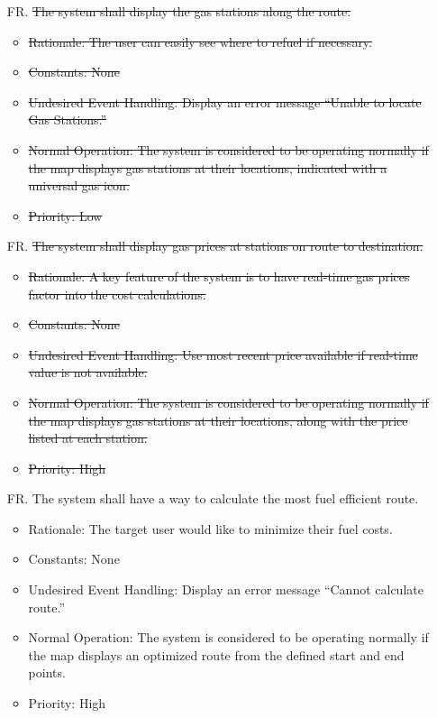 \documentclass[12pt]{article}
\newcounter{reqnum} %
\begin{document}
\begin{itemize}
\item[FR\refstepcounter{reqnum}\thereqnum. ] \sout{The system shall display the gas stations along the route.}
\begin{itemize}
    \item \sout{Rationale: The user can easily see where to refuel if necessary.}
    \item \sout{Constants: None}
    \item \sout{Undesired Event Handling: Display an error message “Unable to locate Gas Stations.”}
    \item \sout{Normal Operation: The system is considered to be operating normally if the map displays gas stations at their locations, indicated with a universal gas icon.}
    \item \sout{Priority: Low}
\end{itemize}

\item[FR\refstepcounter{reqnum}\thereqnum. ] \sout{The system shall display gas prices at stations on route to destination.}
\begin{itemize}
    \item \sout{Rationale: A key feature of the system is to have real-time gas prices factor into the cost calculations.}
    \item \sout{Constants: None}
    \item \sout{Undesired Event Handling: Use most recent price available if real-time value is not available.}
    \item \sout{Normal Operation: The system is considered to be operating normally if the map displays gas stations at their locations, along with the price listed at each station.}
	\item \sout{Priority: High}
\end{itemize}

\item[FR\refstepcounter{reqnum}\thereqnum. ] The system shall have a way to calculate the most fuel efficient route.
\begin{itemize}
    \item Rationale: The target user would like to minimize their fuel costs.
    \item Constants: None
    \item Undesired Event Handling: Display an error message “Cannot calculate route.”
    \item Normal Operation: The system is considered to be operating normally if the map displays an optimized route from the defined start and end points.
	\item Priority: High
\end{itemize}


\end{itemize}
\end{document}
